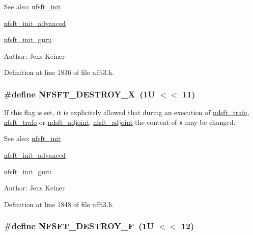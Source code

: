 \begin{Desc}
\item[See also:]\hyperlink{group__nfsft_ga1}{nfsft\_\-init} 

\hyperlink{group__nfsft_ga2}{nfsft\_\-init\_\-advanced} 

\hyperlink{group__nfsft_ga3}{nfsft\_\-init\_\-guru} \end{Desc}
\begin{Desc}
\item[Author:]Jens Keiner \end{Desc}


Definition at line 1836 of file nfft3.h.\hypertarget{group__nfsft_ga35}{
\subsubsection[NFSFT\_\-DESTROY\_\-X]{\setlength{\rightskip}{0pt plus 5cm}\#define NFSFT\_\-DESTROY\_\-X~(1U $<$$<$ 11)}}
\label{group__nfsft_ga35}


If this flag is set, it is explicitely allowed that during an execution of \hyperlink{group__nfsft_ga6}{ndsft\_\-trafo}, \hyperlink{group__nfsft_ga8}{nfsft\_\-trafo} or \hyperlink{group__nfsft_ga7}{ndsft\_\-adjoint}, \hyperlink{group__nfsft_ga9}{nfsft\_\-adjoint} the content of {\tt x} may be changed. 

\begin{Desc}
\item[See also:]\hyperlink{group__nfsft_ga1}{nfsft\_\-init} 

\hyperlink{group__nfsft_ga2}{nfsft\_\-init\_\-advanced} 

\hyperlink{group__nfsft_ga3}{nfsft\_\-init\_\-guru} \end{Desc}
\begin{Desc}
\item[Author:]Jens Keiner \end{Desc}


Definition at line 1848 of file nfft3.h.\hypertarget{group__nfsft_ga36}{
\subsubsection[NFSFT\_\-DESTROY\_\-F]{\setlength{\rightskip}{0pt plus 5cm}\#define NFSFT\_\-DESTROY\_\-F~(1U $<$$<$ 12)}}
\label{group__nfsft_ga36}


